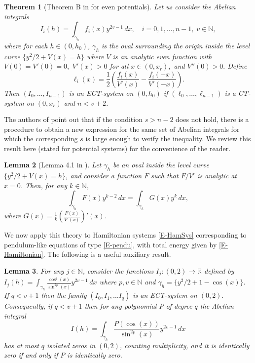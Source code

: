 \documentclass[12pt,psamsfonts]{amsart}
\newtheorem {theorem}{Theorem}[section]
\newtheorem {lemma}  [theorem]{Lemma}
\begin{document}
\begin{theorem}[{Theorem B in \cite{Grau2011} for even potentials}]
\label{T-THM}
Let us consider the Abelian integrals
\begin{equation*}
    I_i(h)=\int_{\gamma_h}f_i(x)y^{2v-1}\, dx, \quad i=0,1,\dots, n-1,\; v\in{\mathbb{N}},
\end{equation*}
where for each $h\in(0,h_0)$, $\gamma_h$ is the oval surrounding the
origin inside the level curve $\{{y^{2}}/{2}+V(x)=h\}$ where $V$ is
an analytic even function with $V(0)=V'(0)=0,\,\,V'(x)> 0$ for all
$x\in (0,x_r),$ and  $V''(0)>0.$ Define
\begin{equation*}
    \ell_i(x)=\frac12\left(\frac{f_i(x)}{V'(x)}-\frac{f_i(-x)}{V'(-x)}\right).
\end{equation*}
Then $(I_0,\dots, I_{n-1})$ is an ECT-system on $(0,h_0)$ if $(\ell_0,\dots, \ell_{n-1})$ is a
CT-system on $(0,x_r)$ and $n<v+2$.
\end{theorem}

The authors of \cite{Grau2011} point out that if the
condition $s> n-2 $ does not hold, there is a
procedure to obtain a new expression for the same set of Abelian
integrals for which the corresponding $s$ is large enough to verify
the inequality. We review this result here (stated for potential
systems)  for the convenience of the reader.

\begin{lemma}[{Lemma 4.1 in \cite{Grau2011}}]
\label{L-LEM} Let ${\gamma}_h$ be an oval inside the level curve $\{y^2/2+V(x)=h\}$, and consider a
function $F$ such that $F/V'$ is analytic at $x=0$. Then, for any $k\in{\mathbb{N}}$,
    \begin{equation*}
    \label{e-subibaja}
        \int_{{\gamma}_h} F(x) y^{k-2} \, dx = \int_{{\gamma}_h} G(x) y^k \, dx,
    \end{equation*}
where $G(x) = \frac{1}{k} \left(\frac{F(x)}{V'(x)}\right)'(x)$.
\end{lemma}

We now apply this theory to Hamiltonian systems \eqref{E-HamSys} corresponding to pendulum-like
 equations of type \eqref{E-pendu}, with total energy given by \eqref{E-Hamiltonian}. The
 following is a useful auxiliary result.

\begin{lemma}
\label{L-Tche} For any $j\in {\mathbb{N}}$, consider the functions $I_j:(0,2)\longrightarrow{\mathbb{R}}$ defined by
$I_j(h)=\int_{\gamma_h}\frac{\cos^j(x)}{\sin^{2p}(x)}y^{2v-1}\, dx$ where $p,v\in{\mathbb{N}}$ and
${\gamma}_h=\{{y^2}/{2}+1-\cos(x)\}.$ If $q<v+1$  then the family $(I_0,I_1,\ldots I_q)$ is an
ECT-system on $(0,2).$ Consequently, if $q<v+1$ then for any polynomial $P$ of degree $q$ the
Abelian integral
\begin{equation}
\label{E-AbelianInt}
    I(h)=\int_{\gamma_h}\frac{P(\cos(x))}{\sin^{2p}(x)}y^{2v-1}\, dx
\end{equation}
has at most $q$ isolated zeros in $(0,2)$, counting
multiplicity,
and it is identically zero if and only if $P$ is identically zero.
\end{lemma}
\end{document}
